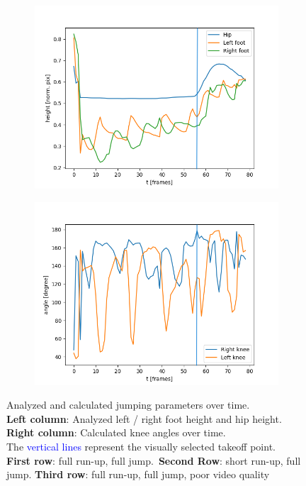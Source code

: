 \begin{figure}[h!]
\begin{subfigure}[b]{0.5\textwidth}
        \includegraphics*[scale=0.45]{jump_runup_poor.png}
        \label{subfig:runup_jump_height}
    \end{subfigure}
    \begin{subfigure}[b]{0.5\textwidth}
        \includegraphics*[scale=0.45]{jump_runup_poor_angles.png}
        \label{subfig:runup_jump_angles}
    \end{subfigure}
    \caption[Analyzed jumping parameters over time]{Analyzed and calculated
    jumping parameters over time.\\
    \textbf{Left column}: Analyzed left / right foot height and hip height.\\
    \textbf{Right column}: Calculated knee angles over time.\\
    The \textcolor{blue}{vertical lines} represent the visually selected
    takeoff point.\\
    \textbf{First row}: full run-up, full jump.\ \textbf{Second Row}: short 
    run-up, full jump.
    \textbf{Third row}: full run-up, full jump, poor video quality}
    \label{fig:4_angles_height_plot}
\end{figure}
\FloatBarrier

